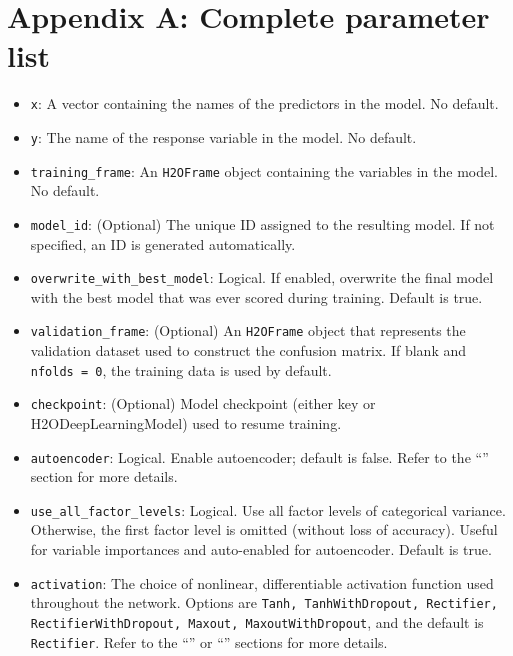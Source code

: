 \section{Appendix A: Complete parameter list}
\begin{itemize}

\item \texttt{x}: A vector containing the names of the predictors in the model. No default.

\item \texttt{y}: The name of the response variable in the model. No default.

\item \texttt{training\_frame}: An \texttt{H2OFrame} object containing the variables in the model.  No default.

\item \texttt{model\_id}: (Optional) The unique ID assigned to the resulting model. If not specified, an ID is generated automatically. 

\item \texttt{overwrite\_with\_best\_model}: Logical. If enabled, overwrite the final model with the best model that was ever scored during training. Default is true.

\item \texttt{validation\_frame}: (Optional) An \texttt{H2OFrame} object that represents the validation dataset used to construct the confusion matrix. If blank and \texttt{nfolds = 0}, the training data is used by default. 

\item \texttt{checkpoint}: (Optional) Model checkpoint (either key or H2ODeepLearningModel) used to resume training. 

\item \texttt{autoencoder}: Logical. Enable autoencoder; default is false. Refer to the ``'' section for more details.

\item \texttt{use\_all\_factor\_levels}: Logical. Use all factor levels of categorical variance. Otherwise, the first factor level is omitted (without loss of accuracy). Useful for variable importances and auto-enabled for autoencoder.  Default is true.

\item \texttt{activation}: The choice of nonlinear, differentiable activation function used throughout the network. Options are \texttt{Tanh, TanhWithDropout, Rectifier, RectifierWithDropout, Maxout, MaxoutWithDropout}, and the default is \texttt{Rectifier}. Refer to the ``'' or ``'' sections for more details.


\end{itemize}
